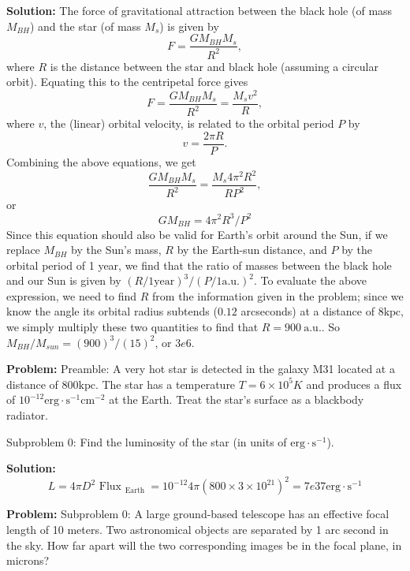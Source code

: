 \documentclass[10pt]{article}
\begin{document}
\textbf{Solution:}
The force of gravitational attraction between the black hole (of mass $M_{BH}$) and the star (of mass $M_s$) is given by
\begin{equation}
F = \frac{G M_{BH} M_s}{R^2},
\end{equation}
where $R$ is the distance between the star and black hole (assuming a circular orbit).  Equating this to the centripetal force gives
\begin{equation}
F = \frac{G M_{BH} M_s}{R^2} = \frac{M_s v^2}{R},
\end{equation}
where $v$, the (linear) orbital velocity, is related to the orbital period $P$ by
\begin{equation}
v = \frac{2\pi R}{P}.
\end{equation}
Combining the above equations, we get
\begin{equation}
\frac{G M_{BH} M_s}{R^2} = \frac{M_s 4 \pi^2 R^2}{RP^2},
\end{equation}
or 
\begin{equation}
G M_{BH} = 4 \pi^2 R^3 / P^2
\end{equation}
Since this equation should also be valid for Earth's orbit around the Sun, if we replace $M_{BH}$ by the Sun's mass, $R$ by the Earth-sun distance, and $P$ by the orbital period of 1 year, we find that the ratio of masses between the black hole and our Sun is given by $(R / 1 \mathrm{year})^3 / (P / 1 \mathrm{a.u.})^2$.
To evaluate the above expression, we need to find $R$ from the information given in the problem; since we know the angle its orbital radius subtends ($0.12$ arcseconds) at a distance of $8 \mathrm{kpc}$, we simply multiply these two quantities to find that $R = 900~\mathrm{a.u.}$.  So $M_{BH}/M_{sun} = (900)^3/(15)^2$, or $\boxed{3e6}$.


\textbf{Problem:}
Preamble: A very hot star is detected in the galaxy M31 located at a distance of $800 \mathrm{kpc}$. The star has a temperature $T = 6 \times 10^{5} K$ and produces a flux of $10^{-12} \mathrm{erg} \cdot \mathrm{s}^{-1} \mathrm{cm}^{-2}$ at the Earth. Treat the star's surface as a blackbody radiator.

Subproblem 0: Find the luminosity of the star (in units of $\mathrm{erg} \cdot \mathrm{s}^{-1}$).


\textbf{Solution:}
\[
  L=4 \pi D^{2} \text { Flux }_{\text {Earth }}=10^{-12} 4 \pi\left(800 \times 3 \times 10^{21}\right)^{2}=\boxed{7e37} \mathrm{erg} \cdot \mathrm{s}^{-1}
\]


\textbf{Problem:}
Subproblem 0: A large ground-based telescope has an effective focal length of 10 meters. Two astronomical objects are separated by 1 arc second in the sky. How far apart will the two corresponding images be in the focal plane, in microns?
\end{document}
